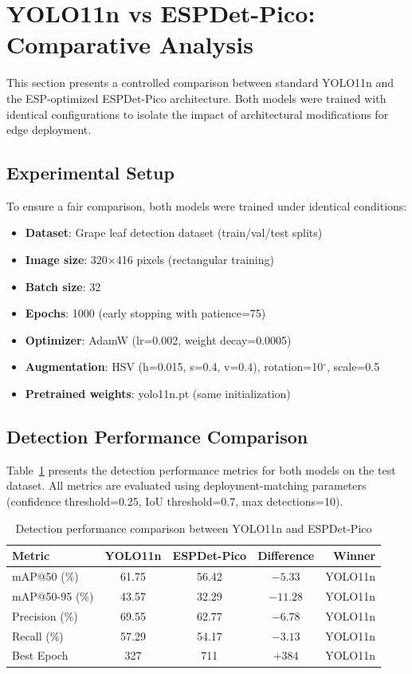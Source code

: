 \documentclass[12pt,a4paper]{article}
\begin{document}
\section*{YOLO11n vs ESPDet-Pico: Comparative Analysis}

This section presents a controlled comparison between standard YOLO11n and the ESP-optimized ESPDet-Pico architecture. Both models were trained with identical configurations to isolate the impact of architectural modifications for edge deployment.

\subsection*{Experimental Setup}

To ensure a fair comparison, both models were trained under identical conditions:
\begin{itemize}
    \item \textbf{Dataset}: Grape leaf detection dataset (train/val/test splits)
    \item \textbf{Image size}: 320$\times$416 pixels (rectangular training)
    \item \textbf{Batch size}: 32
    \item \textbf{Epochs}: 1000 (early stopping with patience=75)
    \item \textbf{Optimizer}: AdamW (lr=0.002, weight decay=0.0005)
    \item \textbf{Augmentation}: HSV (h=0.015, s=0.4, v=0.4), rotation=10$^{\circ}$, scale=0.5
    \item \textbf{Pretrained weights}: yolo11n.pt (same initialization)
\end{itemize}

\subsection*{Detection Performance Comparison}

Table~\ref{tab:performance} presents the detection performance metrics for both models on the test dataset. All metrics are evaluated using deployment-matching parameters (confidence threshold=0.25, IoU threshold=0.7, max detections=10).

\begin{table}[H]
\centering
\caption{Detection performance comparison between YOLO11n and ESPDet-Pico}
\label{tab:performance}
\begin{tabular}{lcccr}
\toprule
\textbf{Metric} & \textbf{YOLO11n} & \textbf{ESPDet-Pico} & \textbf{Difference} & \textbf{Winner} \\
\midrule
mAP@50 (\%)         & 61.75 & 56.42 & $-5.33$ & YOLO11n \\
mAP@50-95 (\%)      & 43.57 & 32.29 & $-11.28$ & YOLO11n \\
Precision (\%)      & 69.55 & 62.77 & $-6.78$ & YOLO11n \\
Recall (\%)         & 57.29 & 54.17 & $-3.13$ & YOLO11n \\
\midrule
Best Epoch          & 327   & 711   & $+384$ & YOLO11n \\
\bottomrule
\end{tabular}
\end{table}
\end{document}
